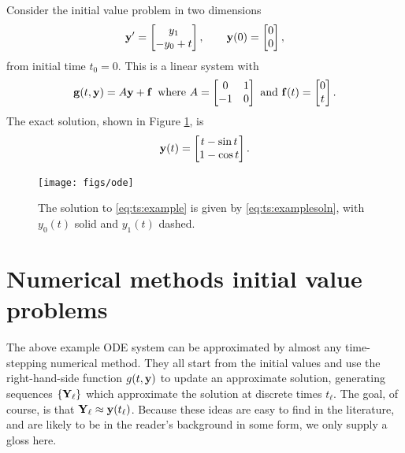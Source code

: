 \noindent\hrulefill
\begin{example}  \label{ex:ts:odeeasy} Consider the initial value problem in two dimensions
\begin{equation}
   \mathbf{y}' = \begin{bmatrix} y_1 \\ - y_0 + t\end{bmatrix}, \qquad \mathbf{y}(0) = \begin{bmatrix} 0 \\ 0 \end{bmatrix}, \label{eq:ts:example}
\end{equation}
from initial time $t_0=0$.  This is a linear system with
    $$\mathbf{g}(t,\mathbf{y}) = A \mathbf{y} + \mathbf{f} \,\text{ where } A = \begin{bmatrix} 0 & 1 \\ -1 & 0 \end{bmatrix} \text{ and } \mathbf{f}(t) = \begin{bmatrix} 0 \\ t\end{bmatrix}.$$
The exact solution, shown in Figure \ref{fig:ts:ode}, is
\begin{equation}
    \mathbf{y}(t) = \begin{bmatrix} t - \sin t \\ 1 - \cos t \end{bmatrix}.\label{eq:ts:examplesoln}
\end{equation}

\vspace{-3mm}
\begin{figure}
\texttt{[image: figs/ode]}
\caption{The solution to \eqref{eq:ts:example} is given by \eqref{eq:ts:examplesoln}, with $y_0(t)$ solid and $y_1(t)$ dashed.}
\label{fig:ts:ode}
\end{figure}
\end{example}
\vspace{-5mm}
\noindent\hrulefill


\section{Numerical methods initial value problems}

The above example ODE system can be approximated by almost any time-stepping numerical method.  They all start from the initial values and use the right-hand-side function $g(t,\mathbf{y})$ to update an approximate solution, generating sequences $\{\mathbf{Y}_\ell\}$ which approximate the solution at discrete times $t_\ell$.  The goal, of course, is that $\mathbf{Y}_\ell \approx \mathbf{y}(t_\ell)$.  Because these ideas are easy to find in the literature, and are likely to be in the reader's background in some form, we only supply a gloss here.

